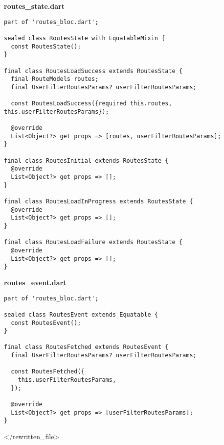 \textbf{routes\_state.dart}
\begin{verbatim}
part of 'routes_bloc.dart';

sealed class RoutesState with EquatableMixin {
  const RoutesState();
}

final class RoutesLoadSuccess extends RoutesState {
  final RouteModels routes;
  final UserFilterRoutesParams? userFilterRoutesParams;

  const RoutesLoadSuccess({required this.routes, this.userFilterRoutesParams});

  @override
  List<Object?> get props => [routes, userFilterRoutesParams];
}

final class RoutesInitial extends RoutesState {
  @override
  List<Object?> get props => [];
}

final class RoutesLoadInProgress extends RoutesState {
  @override
  List<Object?> get props => [];
}

final class RoutesLoadFailure extends RoutesState {
  @override
  List<Object?> get props => [];
}
\end{verbatim}

\textbf{routes\_event.dart}
\begin{verbatim}
part of 'routes_bloc.dart';

sealed class RoutesEvent extends Equatable {
  const RoutesEvent();
}

final class RoutesFetched extends RoutesEvent {
  final UserFilterRoutesParams? userFilterRoutesParams;

  const RoutesFetched({
    this.userFilterRoutesParams,
  });

  @override
  List<Object?> get props => [userFilterRoutesParams];
}
\end{verbatim}


</rewritten_file>

